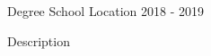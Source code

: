 
\begin{cventries}
  \cventry
    {Degree} %
    {School} %
    {Location} %
    {2018 {-} 2019} %
    {
      \begin{cvitems}
        \item{Description}
      \end{cvitems}
    }

\end{cventries}